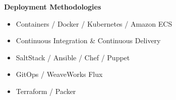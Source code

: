 \textbf{Deployment Methodologies}
\begin{multicols}{2}
    \begin{itemize}
        \item Containers / Docker / Kubernetes / Amazon ECS

        \item Continuous Integration \& Continuous Delivery

        \item SaltStack / Ansible / Chef / Puppet

        \item GitOps / WeaveWorks Flux

        \item Terraform / Packer
    \end{itemize}
\end{multicols}
